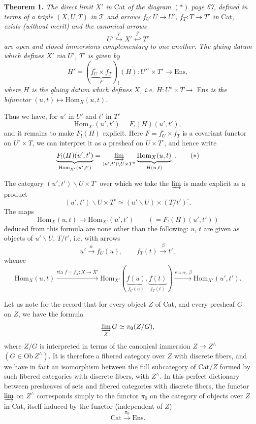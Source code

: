 \documentclass[11pt]{article}
\newcommand{\printedpage}[1]{\marginpar{\footnotesize p.~#1}}
\newcommand{\msp}[1]{\marginpar{\footnotesize [#1]}}
\newcommand{\Hom}{\mathrm{Hom}}
\newcommand{\Cat}{\mathrm{Cat}}
\newcommand{\Ens}{\mathrm{Ens}}
\newcommand{\Ob}{\mathrm{Ob}\,}
\begin{document}
\textbf{Theorem 1.} \textit{The direct limit $X'$ in} Cat \textit{of the diagram} $(*)$ \textit{page 67, defined in terms of a triple $(X,U,T)$ in $\mathcal{T}$ and arrows $f_U : U\longrightarrow U'$, $f_T : T\longrightarrow T'$ in} Cat\textit{, exists (without merit)} \msp{page 70} \textit{and the canonical arrows}
\[
U' \overset{i'}{\hookrightarrow} X' \overset{j'}{\hookleftarrow} T'
\]
\textit{are open and closed immersions complementary to one another. The gluing datum which defines $X'$ via $U'$, $T'$ is given by}
\[
H' = (\underbrace{f_U^{\circ}\times f_T}_{F})_{!}(H) : U'^{\circ}\times T' \longrightarrow \Ens,
\]
\textit{where $H$ is the gluing datum which defines $X$, i.e. $H : U^{\circ}\times T\longrightarrow$} Ens \textit{is the bifunctor $(u,t)\longmapsto \Hom_X(u,t)$.}

Thus we have, for $u'$ in $U'$ and $t'$ in $T'$
\[
\Hom_{X'}(u',t') = F_{!}(H)(u',t'),
\]
and it remains to make $F_{!}(H)$ explicit. Here $F=f_U^{\circ}\times f_T$ is a covariant functor on $U^{\circ}\times T$, we can interpret it as a presheaf on $U\times T^{\circ}$, and hence write
\[
\underbrace{F_{!}(H)(u',t')}_{\Hom_{X'}(u',t')} = \varinjlim_{(u',t')\backslash U\times T^{\circ}} \underbrace{\Hom_X(u,t)}_{H(u,t)} \ .
\tag*{$(*)$}
\]

\printedpage{51}
The category $(u',t')\backslash U\times T^{\circ}$ over which we take the $\varinjlim$ is made explicit as a product
\[
(u',t')\backslash U\times T^{\circ} \simeq (u'\backslash U)\times(T/t')^{\circ}.
\]
The maps
\[
\Hom_X(u,t)\longrightarrow \Hom_{X'}(u',t') \qquad (=F_{!}(H)(u',t'))
\]
\msp{page 71} deduced from this formula are none other than the following: $u$, $t$ are given as objects of $u'\backslash U$, $T/t'$, i.e. with arrows
\[
u'\xrightarrow{\alpha} f_U(u), \qquad f_T(t)\xrightarrow{\beta} t',
\]
whence
\[
\Hom_X(u,t) \xrightarrow{\text{via } f=f_X:X\to X'} \Hom_{X'}(\underbrace{f(u)}_{f_U(u)},\underbrace{f(t)}_{f_T(t)}) \xrightarrow{\text{via } \alpha,\ \beta} \Hom_{X'}(u',t').
\]

Let us note for the record that for every object $Z$ of Cat, and every presheaf $G$ on $Z$, we have the formula
\[
\varinjlim_{Z} G \simeq \pi_0(Z/G),
\]
where $Z/G$ is interpreted in terms of the canonical immersion $Z\longrightarrow Z^{\wedge}$ $(G\in \Ob Z^{\wedge})$. It is therefore a fibered category over $Z$ with discrete fibers, and we have in fact an isomorphism between the full subcategory of $\Cat/Z$ formed by such fibered categories with discrete fibers, with $Z^{\wedge}$. In this perfect dictionary between presheaves of sets and fibered categories with discrete fibers, the functor $\varinjlim$ on $Z^{\wedge}$ corresponds simply to the functor $\pi_0$ on the category of objects over $Z$ in Cat, itself induced by the functor (independent of $Z$)
\[
\Cat \xrightarrow{\pi_0} \Ens.
\]
\end{document}
